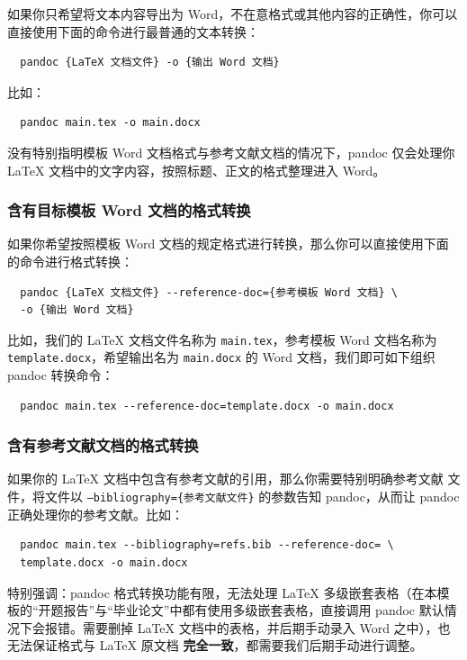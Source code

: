 如果你只希望将文本内容导出为 Word，不在意格式或其他内容的正确性，你可以直接使用下面的命令进行最普通的文本转换：

\begin{verbatim}
  pandoc {LaTeX 文档文件} -o {输出 Word 文档}
\end{verbatim}

比如：

\begin{verbatim}
  pandoc main.tex -o main.docx
\end{verbatim}

没有特别指明模板 Word 文档格式与参考文献文档的情况下，pandoc 仅会处理你 {\LaTeX} 文档中的文字内容，按照标题、正文的格式整理进入 Word。

\subsubsection{含有目标模板 Word 文档的格式转换}

如果你希望按照模板 Word 文档的规定格式进行转换，那么你可以直接使用下面的命令进行格式转换：

\begin{verbatim}
  pandoc {LaTeX 文档文件} --reference-doc={参考模板 Word 文档} \
  -o {输出 Word 文档}
\end{verbatim}

比如，我们的 {\LaTeX} 文档文件名称为 \texttt{main.tex}，参考模板 Word 文档名称为 \texttt{template.docx}，希望输出名为 \texttt{main.docx} 的 Word 文档，我们即可如下组织 pandoc 转换命令：

\begin{verbatim}
  pandoc main.tex --reference-doc=template.docx -o main.docx
\end{verbatim}

\subsubsection{含有参考文献文档的格式转换}

如果你的 LaTeX 文档中包含有参考文献的引用，那么你需要特别明确参考文献  文件，将文件以 \texttt{--bibliography=\{参考文献文件\}} 的参数告知 pandoc，从而让 pandoc 正确处理你的参考文献。比如：

\begin{verbatim}
  pandoc main.tex --bibliography=refs.bib --reference-doc= \
  template.docx -o main.docx
\end{verbatim}

特别强调：pandoc 格式转换功能有限，无法处理 {\LaTeX} 多级嵌套表格（在本模板的“开题报告”与“毕业论文”中都有使用多级嵌套表格，直接调用 pandoc 默认情况下会报错。需要删掉 {\LaTeX} 文档中的表格，并后期手动录入 Word 之中），也无法保证格式与 {\LaTeX} 原文档 \textbf{完全一致}，都需要我们后期手动进行调整。

